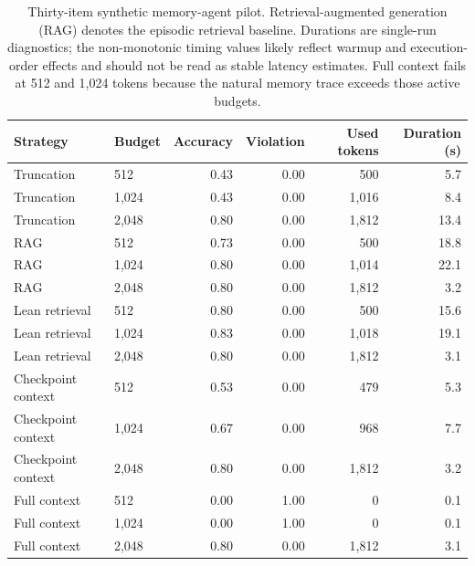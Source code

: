 \documentclass[11pt]{article}
\begin{document}
\begin{table}[t]
\centering
\small
\begin{tabular}{llrrrr}
\toprule
Strategy & Budget & Accuracy & Violation & Used tokens & Duration (s) \\
\midrule
Truncation & 512 & 0.43 & 0.00 & 500 & 5.7 \\
Truncation & 1,024 & 0.43 & 0.00 & 1,016 & 8.4 \\
Truncation & 2,048 & 0.80 & 0.00 & 1,812 & 13.4 \\
RAG & 512 & 0.73 & 0.00 & 500 & 18.8 \\
RAG & 1,024 & 0.80 & 0.00 & 1,014 & 22.1 \\
RAG & 2,048 & 0.80 & 0.00 & 1,812 & 3.2 \\
Lean retrieval & 512 & 0.80 & 0.00 & 500 & 15.6 \\
Lean retrieval & 1,024 & 0.83 & 0.00 & 1,018 & 19.1 \\
Lean retrieval & 2,048 & 0.80 & 0.00 & 1,812 & 3.1 \\
Checkpoint context & 512 & 0.53 & 0.00 & 479 & 5.3 \\
Checkpoint context & 1,024 & 0.67 & 0.00 & 968 & 7.7 \\
Checkpoint context & 2,048 & 0.80 & 0.00 & 1,812 & 3.2 \\
Full context & 512 & 0.00 & 1.00 & 0 & 0.1 \\
Full context & 1,024 & 0.00 & 1.00 & 0 & 0.1 \\
Full context & 2,048 & 0.80 & 0.00 & 1,812 & 3.1 \\
\bottomrule
\end{tabular}
\caption{Thirty-item synthetic memory-agent pilot.  Retrieval-augmented generation (RAG) denotes the episodic retrieval baseline.  Durations are single-run diagnostics; the non-monotonic timing values likely reflect warmup and execution-order effects and should not be read as stable latency estimates.  Full context fails at
512 and 1,024 tokens because the natural memory trace exceeds those active
budgets.}
\label{tab:synthetic_memory_pilot}
\end{table}
\end{document}
